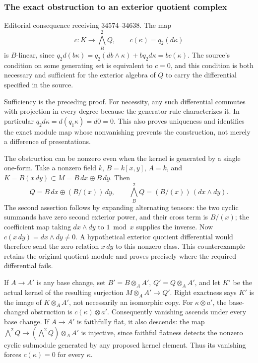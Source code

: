 \subsubsection{The exact obstruction to an exterior quotient complex}\label{algebra-proof-042-the-exact-obstruction-to-an-exterior-quotient-complex}

Editorial consequence receiving 34574--34638. The map \[
c:K\longrightarrow\bigwedge_B^2Q,\qquad c(\kappa)=q_2(d\kappa)
\] is \(B\)-linear, since \(q_2d(b\kappa)=q_2(db\wedge\kappa)+bq_2d\kappa=bc(\kappa)\). The source's condition on some generating set is equivalent to \(c=0\), and this condition is both necessary and sufficient for the exterior algebra of \(Q\) to carry the differential specified in the source.

Sufficiency is the preceding proof. For necessity, any such differential commutes with projection in every degree because the generator rule characterizes it. In particular \(q_2d\kappa=d(q_1\kappa)=d0=0\). This also proves uniqueness and identifies the exact module map whose nonvanishing prevents the construction, not merely a difference of presentations.

The obstruction can be nonzero even when the kernel is generated by a single one-form. Take a nonzero field \(k\), \(B=k[x,y]\), \(A=k\), and \(K=B(x\,dy)\subset M=B\,dx\oplus B\,dy\). Then \[
Q=B\,dx\oplus(B/(x))\,dy,
\qquad\bigwedge^2_BQ=(B/(x))\,(dx\wedge dy).
\] The second assertion follows by expanding alternating tensors: the two cyclic summands have zero second exterior power, and their cross term is \(B/(x)\); the coefficient map taking \(dx\wedge dy\) to \(1\bmod x\) supplies the inverse. Now \(c(x\,dy)=dx\wedge dy\ne0\). A hypothetical exterior quotient differential would therefore send the zero relation \(x\,dy\) to this nonzero class. This counterexample retains the original quotient module and proves precisely where the required differential fails.

If \(A\to A'\) is any base change, set \(B'=B\otimes_A A'\), \(Q'=Q\otimes_A A'\), and let \(K'\) be the actual kernel of the resulting surjection \(M\otimes_A A'\to Q'\). Right exactness says \(K'\) is the image of \(K\otimes_A A'\), not necessarily an isomorphic copy. For \(\kappa\otimes a'\), the base-changed obstruction is \(c(\kappa)\otimes a'\). Consequently vanishing ascends under every base change. If \(A\to A'\) is faithfully flat, it also descends: the map \(\bigwedge^2Q\to(\bigwedge^2Q)\otimes_A A'\) is injective, since faithful flatness detects the nonzero cyclic submodule generated by any proposed kernel element. Thus its vanishing forces \(c(\kappa)=0\) for every \(\kappa\).

